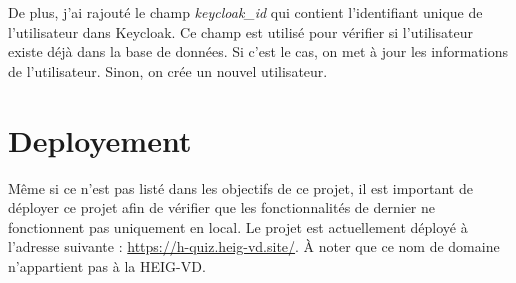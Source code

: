 De plus, j'ai rajouté le champ \emph{keycloak\_id} qui contient l'identifiant unique de l'utilisateur dans Keycloak. Ce champ est utilisé pour vérifier si l'utilisateur existe déjà dans la base de données. Si c'est le cas, on met à jour les informations de l'utilisateur. Sinon, on crée un nouvel utilisateur.

\section{Deployement}
Même si ce n'est pas listé dans les objectifs de ce projet, il est important de déployer ce projet afin de vérifier que les fonctionnalités de dernier ne fonctionnent pas uniquement en local. Le projet est actuellement déployé à l'adresse suivante : \url{https://h-quiz.heig-vd.site/}. À noter que ce nom de domaine n'appartient pas à la HEIG-VD.